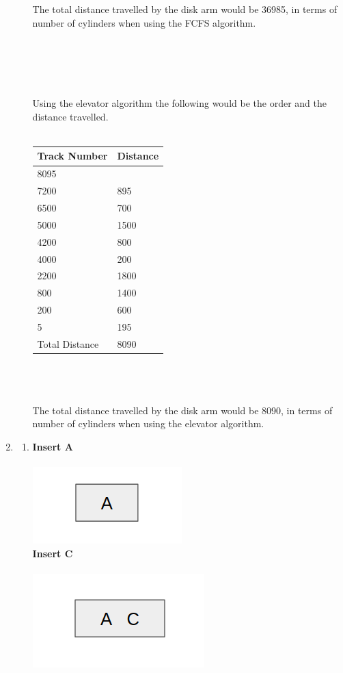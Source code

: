 \documentclass[12pt]{article}
\begin{document}
\begin{enumerate}
\begin{enumerate}
The total distance travelled by the disk arm would be 36985, in terms of number of cylinders when using the FCFS algorithm.\\\\\\\\\\\\
Using the elevator algorithm the following would be the order and the distance travelled.\\\\
\begin{tabular}{ | l | l | }
\hline
	Track Number & Distance \\ \hline
	8095 &  \\ \hline
	7200 & 895 \\ \hline
	6500 & 700 \\ \hline
	5000 & 1500 \\ \hline
	4200 & 800 \\ \hline
	4000 & 200 \\ \hline
	2200 & 1800 \\ \hline
	800 & 1400 \\ \hline
	200 & 600 \\ \hline
	5 & 195 \\ \hline
	Total Distance & 8090 \\ \hline
\end{tabular}\\\\\\
The total distance travelled by the disk arm would be 8090, in terms of number of cylinders when using the elevator algorithm.
\end{enumerate}
\item \begin{enumerate}
\item
\textbf{Insert A}\\\\
\includegraphics[scale=0.6]{q31.png}\\
\textbf{Insert C}\\\\
\includegraphics[scale=0.6]{q32.png}\\

\end{enumerate}
\end{enumerate}
\end{document}
